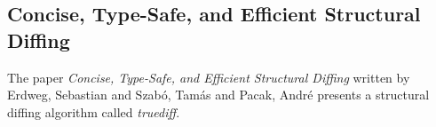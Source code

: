 \subsection{Concise, Type-Safe, and Efficient Structural Diffing}

The paper \textit{Concise, Type-Safe, and Efficient Structural Diffing} written by Erdweg, Sebastian and Szab{\'o}, Tam{\'a}s and Pacak, Andr{\'e} presents a structural diffing algorithm called \textit{truediff}\cite{erdweg2021concise}.  